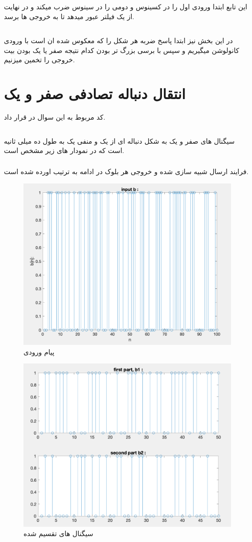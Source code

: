 \documentclass[10pt]{article}
\begin{document}
	\subsection{}
	این تابع ابتدا ورودی اول را در کسینوس و دومی را در سینوس ضرب میکند و در نهایت از یک فیلتر
	عبور میدهد تا به خروجی ها برسد.
	
	
	
	\subsection{}
	در این بخش نیز ابتدا پاسخ ضربه هر شکل را که معکوس شده ان است با ورودی کانولوشن میگیریم و سپس با برسی بزرگ تر بودن کدام نتیجه صفر یا یک بودن بیت خروجی را تخمین میزنیم. 
	
	
	\newpage
	\section{انتقال دنباله تصادفی صفر و یک}
	کد‌ مربوط به این سوال در 
	قرار داد.
	\subsection{}
	سیگنال های صفر و یک به شکل دنباله ای از یک و منفی یک به طول ده میلی ثانیه است که در نمودار های زیر مشخص است.

	\subsubsection{}
	 فرایند ارسال شبیه سازی شده و خروجی هر بلوک در ادامه به ترتیب اورده شده است.
	 
	\begin{figure}[h]
		\centering
		\includegraphics[width=0.5\linewidth]{../img/3.1.1}
		\caption{پیام ورودی}
		\label{fig:3-1-1}
	\end{figure}

	\begin{figure}[h]
		\centering
		\includegraphics[width=0.5\linewidth]{../img/3.1.2}
		\caption{سیگنال های تقسیم شده}
		\label{fig:3-1-2}
	\end{figure}
	
\end{document}
